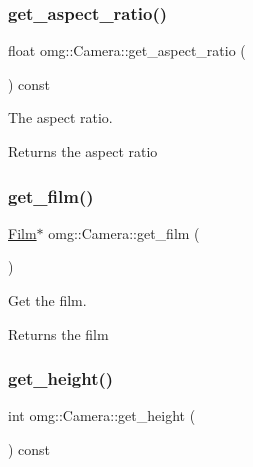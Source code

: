 \subsubsection{\texorpdfstring{get\_aspect\_ratio()}{get\_aspect\_ratio()}}
{\footnotesize\ttfamily float omg\+::\+Camera\+::get\+\_\+aspect\+\_\+ratio (\begin{DoxyParamCaption}{ }\end{DoxyParamCaption}) const\hspace{0.3cm}{\ttfamily [inline]}}



The aspect ratio. 

\begin{DoxyReturn}{Returns}
the aspect ratio 
\end{DoxyReturn}
\mbox{\label{classomg_1_1_camera_a6feb3185dc41c47b1d2749d58b8d0c13}} 
\subsubsection{\texorpdfstring{get\_film()}{get\_film()}}
{\footnotesize\ttfamily \mbox{\hyperlink{classomg_1_1_film}{Film}}$\ast$ omg\+::\+Camera\+::get\+\_\+film (\begin{DoxyParamCaption}{ }\end{DoxyParamCaption})\hspace{0.3cm}{\ttfamily [inline]}}



Get the film. 

\begin{DoxyReturn}{Returns}
the film 
\end{DoxyReturn}
\mbox{\label{classomg_1_1_camera_a4003f1cf690980d47b3307e6eefe3003}} 
\subsubsection{\texorpdfstring{get\_height()}{get\_height()}}
{\footnotesize\ttfamily int omg\+::\+Camera\+::get\+\_\+height (\begin{DoxyParamCaption}{ }\end{DoxyParamCaption}) const\hspace{0.3cm}{\ttfamily [inline]}}



